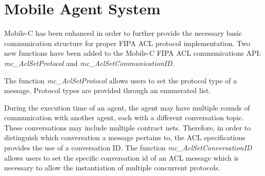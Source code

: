 

  \section{Mobile Agent System}\label{sec:impl_mas}
    Mobile-C has been enhanced in order to further provide the necessary basic
      communication structure for proper FIPA ACL protocol implementation.
    Two new functions have been added to the Mobile-C FIPA ACL communications API:
      \textit{mc\_AclSetProtocol} and \textit{mc\_AclSetCommunicationID}.

    The function \textit{mc\_AclSetProtocol} allows users to set the protocol
      type of a message.
    Protocol types are provided through an enumerated list.

    During the execution time of an agent, the agent may have multiple rounds
      of communication with another agent, each with a different conversation
      topic.
    These conversations may include multiple contract nets.
    Therefore, in order to distinguish which conversation a message pertains
      to, the ACL specifications provides the use of a conversation ID.
    The function \textit{mc\_AclSetConversationID} allows users to set the 
      specific conversation id of an ACL message which is necessary to allow
      the instantiation of multiple concurrent protocols.



